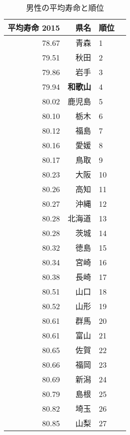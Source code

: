 %



  \begin{table}[H]
  \caption{男性の平均寿命と順位}
  \centering
  \scriptsize
  \begin{tabular}{rrlr}
    \hline
   平均寿命 2015 & 県名 & 順位 \\
    \hline
   78.67 & 青森 &   1 \\
   79.51 & 秋田 &   2 \\
   79.86 & 岩手 &   3 \\
   79.94 & \textbf{和歌山} &   4 \\
   80.02 & 鹿児島 &   5 \\
   80.10 & 栃木 &   6 \\
   80.12 & 福島 &   7 \\
   80.16 & 愛媛 &   8 \\
   80.17 & 鳥取 &   9 \\
   80.23 & 大阪 &  10 \\
   80.26 & 高知 &  11 \\
   80.27 & 沖縄 &  12 \\
   80.28 & 北海道 &  13 \\
   80.28 & 茨城 &  14 \\
   80.32 & 徳島 &  15 \\
   80.34 & 宮崎 &  16 \\
   80.38 & 長崎 &  17 \\
   80.51 & 山口 &  18 \\
   80.52 & 山形 &  19 \\
   80.61 & 群馬 &  20 \\
   80.61 & 富山 &  21 \\
   80.65 & 佐賀 &  22 \\
   80.66 & 福岡 &  23 \\
   80.69 & 新潟 &  24 \\
   80.79 & 島根 &  25 \\
   80.82 & 埼玉 &  26 \\
   80.85 & 山梨 &  27 \\

\end{tabular}
\end{table}

